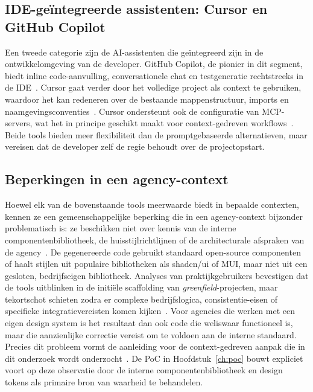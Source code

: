\subsection{IDE-geïntegreerde assistenten: Cursor en GitHub Copilot}
\label{subsec:ide-tools}

Een tweede categorie zijn de AI-assistenten die geïntegreerd zijn in de ontwikkelomgeving van de developer. GitHub Copilot, de pionier in dit segment, biedt inline code-aanvulling, conversationele chat en testgeneratie rechtstreeks in de IDE~\autocite{WikipediaCopilot2021}. Cursor gaat verder door het volledige project als context te gebruiken, waardoor het kan redeneren over de bestaande mappenstructuur, imports en naamgevingsconventies~\autocite{Softr2026}. Cursor ondersteunt ook de configuratie van MCP-servers, wat het in principe geschikt maakt voor context-gedreven workflows~\autocite{LovableCursor2026}. Beide tools bieden meer flexibiliteit dan de promptgebaseerde alternatieven, maar vereisen dat de developer zelf de regie behoudt over de projectopstart.

\subsection{Beperkingen in een agency-context}
\label{subsec:beperkingen-agency}

Hoewel elk van de bovenstaande tools meerwaarde biedt in bepaalde contexten, kennen ze een gemeenschappelijke beperking die in een agency-context bijzonder problematisch is: ze beschikken niet over kennis van de interne componentenbibliotheek, de huisstijlrichtlijnen of de architecturale afspraken van de agency~\autocite{Fang2024}. De gegenereerde code gebruikt standaard open-source componenten of haalt stijlen uit populaire bibliotheken als shadcn/ui of MUI, maar niet uit een gesloten, bedrijfseigen bibliotheek. Analyses van praktijkgebruikers bevestigen dat de tools uitblinken in de initiële scaffolding van \textit{greenfield}-projecten, maar tekortschot schieten zodra er complexe bedrijfslogica, consistentie-eisen of specifieke integratievereisten komen kijken~\autocite{AppMakers2026,Fang2024}. Voor agencies die werken met een eigen design system is het resultaat dan ook code die weliswaar functioneel is, maar die aanzienlijke correctie vereist om te voldoen aan de interne standaard. Precies dit probleem vormt de aanleiding voor de context-gedreven aanpak die in dit onderzoek wordt onderzocht~\autocite{Fang2024,AppMakers2026}. De PoC in Hoofdstuk~\ref{ch:poc} bouwt expliciet voort op deze observatie door de interne componentenbibliotheek en design tokens als primaire bron van waarheid te behandelen.

